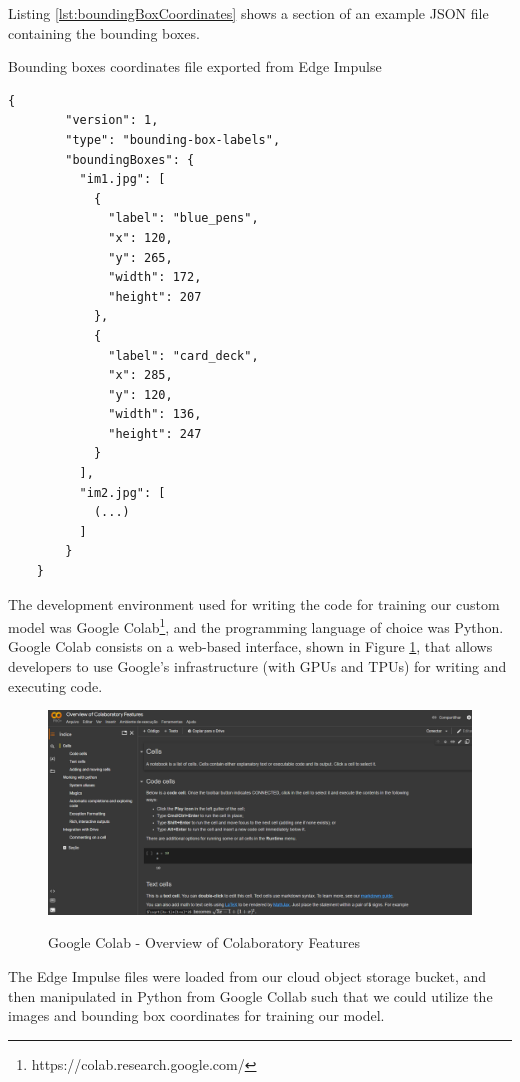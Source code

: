Listing \ref{lst:boundingBoxCoordinates} shows a section of an example JSON file containing
the bounding boxes.

\begin{sourcecode}
\caption{Bounding boxes coordinates file exported from Edge Impulse}
\begin{lstlisting}[label={lst:boundingBoxCoordinates}]
	{
		"version": 1,
		"type": "bounding-box-labels",
		"boundingBoxes": {
		  "im1.jpg": [
			{
			  "label": "blue_pens",
			  "x": 120,
			  "y": 265,
			  "width": 172,
			  "height": 207
			},
			{
			  "label": "card_deck",
			  "x": 285,
			  "y": 120,
			  "width": 136,
			  "height": 247
			}
		  ],
		  "im2.jpg": [
			(...)
		  ]
		}
	}
\end{lstlisting}
\fonte{}
\end{sourcecode}

The development environment used for writing the code for training our custom
model was Google Colab\footnote{https://colab.research.google.com/}, and the
programming language of choice was Python. Google Colab consists on a web-based
interface, shown in Figure \ref{fig:googlecollab}, that allows developers to
use Google's infrastructure (with GPUs and TPUs) for writing and executing
code.

\begin{figure}[H]
	\centering
	\caption[Google Colab - Overview of Colaboratory Features]{Google Colab - Overview of Colaboratory Features}
    \includegraphics[width=1\textwidth]{./images/google-colab.png}
    \label{fig:googlecollab}
\end{figure}

The Edge Impulse files were loaded from our cloud object storage bucket, and then manipulated in Python
from Google Collab such that we could utilize the images and bounding box coordinates for training
our model.

